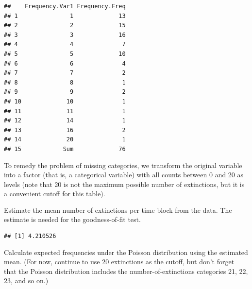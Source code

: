 \documentclass[]{article}
\newenvironment{Shaded}{\begin{snugshade}}{\end{snugshade}}
\newcommand{\DataTypeTok}[1]{\textcolor[rgb]{0.13,0.29,0.53}{#1}}
\newcommand{\DecValTok}[1]{\textcolor[rgb]{0.00,0.00,0.81}{#1}}
\newcommand{\KeywordTok}[1]{\textcolor[rgb]{0.13,0.29,0.53}{\textbf{#1}}}
\newcommand{\NormalTok}[1]{#1}
\newcommand{\OperatorTok}[1]{\textcolor[rgb]{0.81,0.36,0.00}{\textbf{#1}}}
\newcommand{\StringTok}[1]{\textcolor[rgb]{0.31,0.60,0.02}{#1}}
\begin{document}
\begin{verbatim}
##    Frequency.Var1 Frequency.Freq
## 1               1             13
## 2               2             15
## 3               3             16
## 4               4              7
## 5               5             10
## 6               6              4
## 7               7              2
## 8               8              1
## 9               9              2
## 10             10              1
## 11             11              1
## 12             14              1
## 13             16              2
## 14             20              1
## 15            Sum             76
\end{verbatim}

To remedy the problem of missing categories, we transform the original
variable into a factor (that is, a categorical variable) with all counts
between 0 and 20 as levels (note that 20 is not the maximum possible
number of extinctions, but it is a convenient cutoff for this table).

\begin{Shaded}
\end{Shaded}

Estimate the mean number of extinctions per time block from the data.
The estimate is needed for the goodness-of-fit test.

\begin{Shaded}
\end{Shaded}

\begin{verbatim}
## [1] 4.210526
\end{verbatim}

Calculate expected frequencies under the Poisson distribution using the
estimated mean. (For now, continue to use 20 extinctions as the cutoff,
but don't forget that the Poisson distribution includes the
number-of-extinctions categories 21, 22, 23, and so on.)
\end{document}
